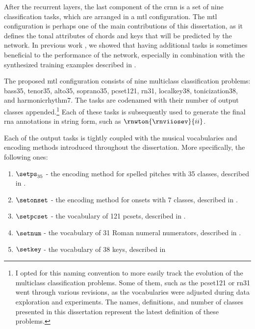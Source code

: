 
After the recurrent layers, the last component of the
\gls{crnn} is a set of nine classification tasks, which are
arranged in a \gls{mtl} configuration. The \gls{mtl}
configuration is perhaps one of the main contributions of
this dissertation, as it defines the tonal attributes of
chords and keys that will be predicted by the network. In
previous work \parencite{napoleslopez2021augmentednet}, we
showed that having additional tasks is sometimes beneficial
to the performance of the network, especially in combination
with the synthesized training examples described in
.

The proposed \gls{mtl} configuration consists of nine
multiclass classification problems: \gls{bass35},
\gls{tenor35}, \gls{alto35}, \gls{soprano35},
\gls{pcset121}, \gls{rn31}, \gls{localkey38},
\gls{tonicization38}, and \gls{harmonicrhythm7}. The tasks
are codenamed with their number of output classes
appended.\footnote{I opted for this naming convention to
more easily track the evolution of the multiclass
classification problems. Some of them, such as the
\gls{pcset121} or \gls{rn31} went through various revisions,
as the vocabularies were adjusted during data exploration
and experiments. The names, definitions, and number of
classes presented in this dissertation represent the latest
definition of these problems.} Each of these tasks is
subsequently used to generate the final \gls{rna}
annotations in string form, such as
$\rnwton{\rnviiosev}{ii}$.

Each of the output tasks is tightly coupled with the musical
vocabularies and encoding methods introduced throughout the
dissertation. More specifically, the following ones:

\begin{enumerate}
    \item[] $\setps_{35}$ - the encoding method for spelled
    pitches with 35 classes, described in
    .
    \item[] $\setonset$ - the encoding method for onsets with 7
    classes, described in
    .
    \item[] $\setpcset$ - the vocabulary of 121 \gls{pcset}s,
    described in .
    \item[] $\setnum$ - the vocabulary of 31 Roman numeral
    numerators, described in
    .
    \item[] $\setkey$ - the vocabulary of 38 keys, described in
\end{enumerate}
